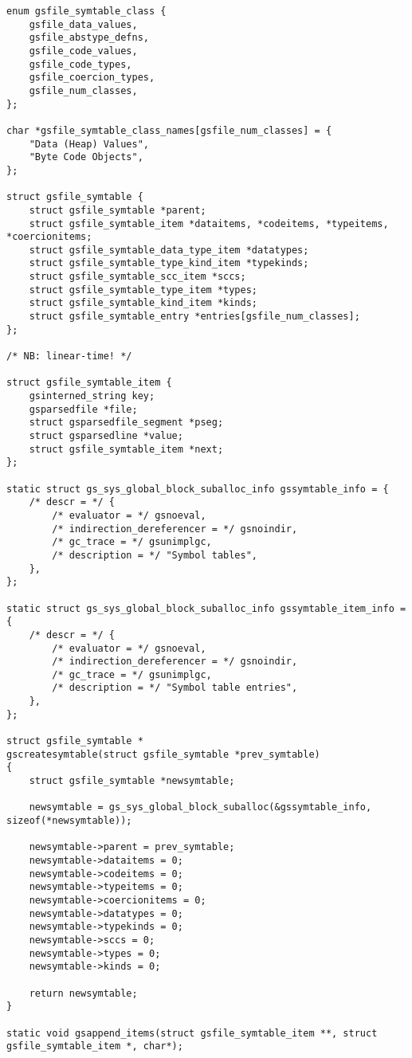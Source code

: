 \documentclass{report}
\begin{document}
\begin{verbatim}
enum gsfile_symtable_class {
    gsfile_data_values,
    gsfile_abstype_defns,
    gsfile_code_values,
    gsfile_code_types,
    gsfile_coercion_types,
    gsfile_num_classes,
};

char *gsfile_symtable_class_names[gsfile_num_classes] = {
    "Data (Heap) Values",
    "Byte Code Objects",
};

struct gsfile_symtable {
    struct gsfile_symtable *parent;
    struct gsfile_symtable_item *dataitems, *codeitems, *typeitems, *coercionitems;
    struct gsfile_symtable_data_type_item *datatypes;
    struct gsfile_symtable_type_kind_item *typekinds;
    struct gsfile_symtable_scc_item *sccs;
    struct gsfile_symtable_type_item *types;
    struct gsfile_symtable_kind_item *kinds;
    struct gsfile_symtable_entry *entries[gsfile_num_classes];
};

/* NB: linear-time! */

struct gsfile_symtable_item {
    gsinterned_string key;
    gsparsedfile *file;
    struct gsparsedfile_segment *pseg;
    struct gsparsedline *value;
    struct gsfile_symtable_item *next;
};

static struct gs_sys_global_block_suballoc_info gssymtable_info = {
    /* descr = */ {
        /* evaluator = */ gsnoeval,
        /* indirection_dereferencer = */ gsnoindir,
        /* gc_trace = */ gsunimplgc,
        /* description = */ "Symbol tables",
    },
};

static struct gs_sys_global_block_suballoc_info gssymtable_item_info = {
    /* descr = */ {
        /* evaluator = */ gsnoeval,
        /* indirection_dereferencer = */ gsnoindir,
        /* gc_trace = */ gsunimplgc,
        /* description = */ "Symbol table entries",
    },
};

struct gsfile_symtable *
gscreatesymtable(struct gsfile_symtable *prev_symtable)
{
    struct gsfile_symtable *newsymtable;

    newsymtable = gs_sys_global_block_suballoc(&gssymtable_info, sizeof(*newsymtable));

    newsymtable->parent = prev_symtable;
    newsymtable->dataitems = 0;
    newsymtable->codeitems = 0;
    newsymtable->typeitems = 0;
    newsymtable->coercionitems = 0;
    newsymtable->datatypes = 0;
    newsymtable->typekinds = 0;
    newsymtable->sccs = 0;
    newsymtable->types = 0;
    newsymtable->kinds = 0;

    return newsymtable;
}

static void gsappend_items(struct gsfile_symtable_item **, struct gsfile_symtable_item *, char*);


\end{verbatim}
\end{document}
